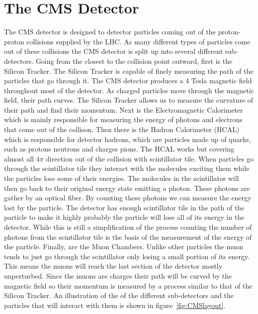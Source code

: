 \section{The CMS Detector}


The CMS detector is designed to detector particles coming out of the proton-proton collisions supplied by the LHC. As many different types of particles come out of these collisions the CMS detector is split up into several different sub-detectors. Going from the closest to the collision point outward, first is the Silicon Tracker. The Silicon Tracker is capable of finely measuring the path of the particles that go through it. The CMS detector produces a 4 Tesla magnetic field throughout most of the detector. As charged particles move through the magnetic field, their path curves. The Silicon Tracker allows us to measure the curvature of their path and find their momentum. Next is the Electromagnetic Calorimeter which is mainly responsible for measuring the energy of photons and electrons that come out of the collison. Then there is the Hadron Calorimeter (HCAL) which is responsible for detector hadrons, which are particles made up of quarks, such as protons neutrons and charges pions. The HCAL works but covering almost all $4\pi$ direction out of the collision with scintillator tile. When particles go through the scintillator tile they interact with the molecules exciting them while the particles lose some of their energies. The molecules in the scintillator will then go back to their original energy state emitting a photon. These photons are gather by an optical fiber. By counting these photons we can measure the energy lost by the particle. The detector has enough scintillator tile in the path of the particle to make it highly probably the particle will lose all of its energy in the detector. While this is still a simplification of the process counting the number of photons from the scintillator tile is the basis of the measurement of the energy of the particle. Finally, are the Muon Chambers. Unlike other particles the muon tends to just go through the scintillator only losing a small portion of its energy. This means the muons will reach the last section of the detector mostly unperturbed. Since the muons are charges their path will be curved by the magnetic field so their momentum is measured by a process similar to that of the Silicon Tracker. An illustration of the of the different sub-detectors and the particles that will interact with them is shown in figure~\ref{fig:CMSlayout}.

